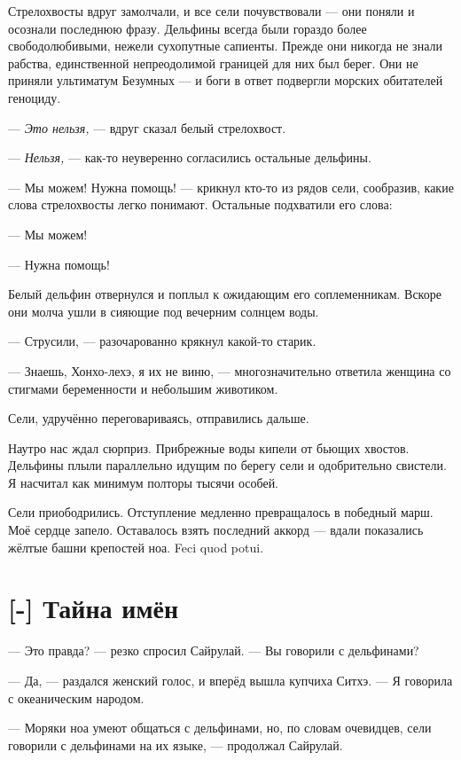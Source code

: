 Стрелохвосты вдруг замолчали, и все сели почувствовали --- они поняли и осознали последнюю фразу.
Дельфины всегда были гораздо более свободолюбивыми, нежели сухопутные сапиенты.
Прежде они никогда не знали рабства, единственной непреодолимой границей для них был берег.
Они не приняли ультиматум Безумных --- и боги в ответ подвергли морских обитателей геноциду.

--- \emph{Это нельзя,} --- вдруг сказал белый стрелохвост.

--- \emph{Нельзя,} --- как-то неуверенно согласились остальные дельфины.

--- Мы можем! Нужна помощь! --- крикнул кто-то из рядов сели, сообразив, какие слова стрелохвосты легко понимают.
Остальные подхватили его слова:

--- Мы можем!

--- Нужна помощь!

Белый дельфин отвернулся и поплыл к ожидающим его соплеменникам.
Вскоре они молча ушли в сияющие под вечерним солнцем воды.

--- Струсили, --- разочарованно крякнул какой-то старик.

--- Знаешь, Хонхо-лехэ, я их не виню, --- многозначительно ответила женщина со стигмами беременности и небольшим животиком.

Сели, удручённо переговариваясь, отправились дальше.

Наутро нас ждал сюрприз.
Прибрежные воды кипели от бьющих хвостов.
Дельфины плыли параллельно идущим по берегу сели и одобрительно свистели.
Я насчитал как минимум полторы тысячи особей.

Сели приободрились.
Отступление медленно превращалось в победный марш.
Моё сердце запело.
Оставалось взять последний аккорд --- вдали показались жёлтые башни крепостей ноа.
Feci quod potui.

\section{[-] Тайна имён}

\textspace

--- Это правда? --- резко спросил Сайрулай.
--- Вы говорили с дельфинами?

--- Да, --- раздался женский голос, и вперёд вышла купчиха Ситхэ.
--- Я говорила с океаническим народом.

--- Моряки ноа умеют общаться с дельфинами, но, по словам очевидцев, сели говорили с дельфинами на их языке, --- продолжал Сайрулай.

